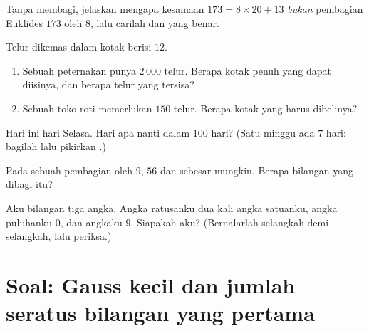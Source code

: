 \begin{exercise}[$\star$]\label{exo:g6:wholes:8}
Tanpa membagi, jelaskan mengapa kesamaan $173 = 8 \times 20 + 13$
\emph{bukan} pembagian Euklides $173$ oleh $8$, lalu carilah  dan  yang benar.
\end{exercise}

\begin{exercise}[$\star\star$]\label{exo:g6:wholes:9}
Telur dikemas dalam kotak berisi $12$.
\begin{enumerate}
  \item Sebuah peternakan punya $2\,000$ telur. Berapa kotak penuh
        yang dapat diisinya, dan berapa telur yang tersisa?
  \item Sebuah toko roti memerlukan $150$ telur. Berapa kotak yang
        harus dibelinya?
\end{enumerate}
\end{exercise}

\begin{exercise}[$\star\star$]\label{exo:g6:wholes:10}
Hari ini hari Selasa. Hari apa nanti dalam $100$ hari? (Satu minggu
ada $7$ hari: bagilah lalu pikirkan .)
\end{exercise}

\begin{exercise}[$\star\star$]\label{exo:g6:wholes:11}
Pada sebuah pembagian oleh $9$,  $56$ dan 
sebesar mungkin. Berapa bilangan yang dibagi itu?
\end{exercise}

\begin{exercise}[$\star\star\star$]\label{exo:g6:wholes:12}
Aku bilangan tiga angka. Angka ratusanku dua kali angka satuanku,
angka puluhanku $0$, dan  angkaku $9$. Siapakah aku?
(Bernalarlah selangkah demi selangkah, lalu periksa.)
\end{exercise}

\section{Soal: Gauss kecil dan jumlah seratus bilangan
yang pertama}

